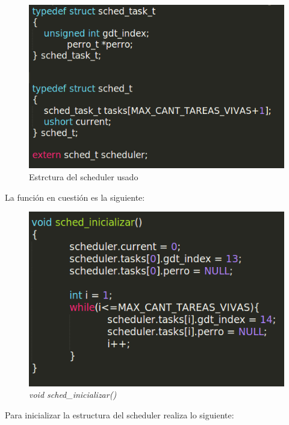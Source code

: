 \begin{figure}[H]
\begin{center}
  \includegraphics[width=\linewidth]{ejercicio7/sched.png}
  \caption{{\small Estrctura del scheduler usado} }
\endminipage
\end{center}
\end{figure}

La función en cuestión es la siguiente:

\begin{figure}[H]
\begin{center}
  \includegraphics[width=\linewidth]{ejercicio7/funcion.png}
  \caption{{\small \textit{void sched\_inicializar()} }}
\endminipage
\end{center}
\end{figure}

Para inicializar la estructura del scheduler realiza lo siguiente:

